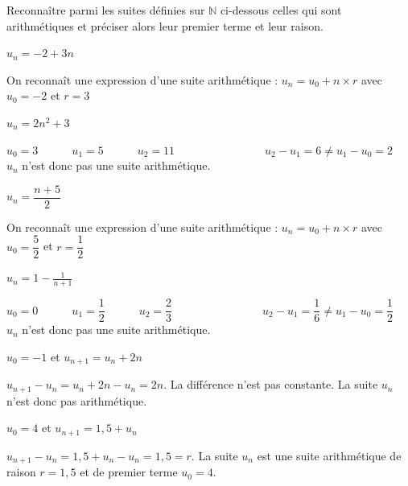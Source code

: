 \documentclass[12pt,a4paper]{article}  %
\begin{document}
Reconnaître parmi les suites définies sur $\mathbb{N}$ ci-dessous celles qui sont arithmétiques et préciser alors leur premier terme et leur raison.
\begin{enumMet}
    \item $u_{n}=-2+3 n$ \quad{}\\
    \begin{corrBox}
        On reconnaît une expression d'une suite arithmétique : $u_n=u_0+n\times r$ avec $u_0=-2$ et $r=3$
    \end{corrBox}
    \item $u_{n}=2 n^{2}+3$ \quad{}\\
    \begin{corrBox}
        $u_0=3\quad\quad\quad u_1=5\quad\quad\quad u_2=11\quad\quad\quad\quad\quad\quad\quad\quad u_2-u_1=6\neq u_1-u_0=2$\\
        $u_n$ n'est donc pas une suite arithmétique.
    \end{corrBox}
    \item $u_{n}=\dfrac{n+5}{2}$ \quad{}\\
    \begin{corrBox}
        On reconnaît une expression d'une suite arithmétique : $u_n=u_0+n\times r$ avec $u_0=\dfrac{5}{2}$ et $r=\dfrac{1}{2}$
    \end{corrBox}
    \item $u_{n}=1-\frac{1}{n+1}$ \quad{}\\
    \begin{corrBox}
        $u_0=0\quad\quad\quad u_1=\dfrac{1}{2}\quad\quad\quad u_2=\dfrac{2}{3}\quad\quad\quad\quad\quad\quad\quad\quad u_2-u_1=\dfrac{1}{6}\neq u_1-u_0=\dfrac{1}{2}$\\
        $u_n$ n'est donc pas une suite arithmétique.
    \end{corrBox}
    \item $u_{0}=-1$ et $u_{n+1}=u_{n}+2 n$ \quad{}\\
    \begin{corrBox}
        $u_{n+1}-u_n=u_n+2 n-u_n=2n$. La différence n'est pas constante. La suite $u_n$ n'est donc pas arithmétique. 
    \end{corrBox}
    \item $u_{0}=4$ et $u_{n+1}=1,5+u_{n}$ \quad{}\\
    \begin{corrBox}
        $u_{n+1}-u_n=1,5+u_n-u_n=1,5=r$. La suite $u_n$ est une suite arithmétique de raison $r=1,5$ et de premier terme $u_0=4$. 
    \end{corrBox}
\end{enumMet}
\end{document}
